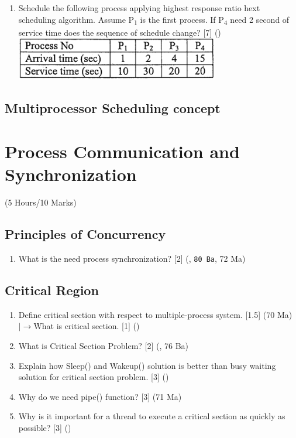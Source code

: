 \documentclass[12pt]{article}
\newcommand{\lb}{\\$\left|\rightarrow\right.$}
\newcommand{\sub}[1]{\textsubscript{#1}}
\begin{document}
\begin{enumerate}
		\item Schedule the following process applying highest response ratio hext scheduling algorithm. Assume P\sub{1} is the first process. If P\sub{4} need 2 second of service time does the sequence of schedule change? \hfill [7] ()\\
		\includegraphics[width=3.5in]{os_24}
	\end{enumerate}
	
	\subsection{Multiprocessor Scheduling concept}

	\pagebreak
\section{Process Communication and Synchronization}
\begin{center}(5 Hours/10 Marks)\end{center}
	\subsection{Principles of Concurrency}
		\begin{enumerate}[noitemsep, topsep=0pt]
			\item What is the need process synchronization? \hfill [2] (, \texttt{80 Ba}, 72 Ma)
		\end{enumerate}
		
	\subsection{Critical Region}
		\begin{enumerate}[noitemsep, topsep=0pt]
			\item Define critical section with respect to multiple-process system. \hfill [1.5] (70 Ma)
			\lb What is critical section. \hfill [1] ()
			
			\item What is Critical Section Problem? \hfill [2] (, 76 Ba)
			
			\item Explain how Sleep() and Wakeup() solution is better than busy waiting solution for critical section problem. \hfill [3] ()
			
			\item Why do we need pipe() function? \hfill [3] (71 Ma)
			
			\item Why is it important for a thread to execute a critical section as quickly as possible? \hfill [3] ()
		\end{enumerate}
		
\end{document}
